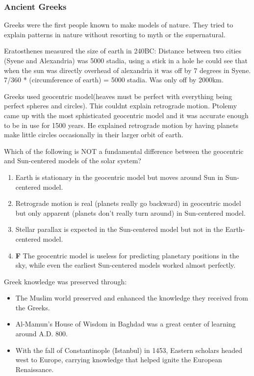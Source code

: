 \documentclass[12pt]{article}
\begin{document}
\subsubsection{Ancient Greeks}
Greeks were the first people known to make models of nature. They tried to explain patterns in nature without resorting to myth or the supernatural.

Eratosthenes measured the size of earth in 240BC: Distance between two cities (Syene and Alexandria) was 5000 stadia, using a stick in a hole he could see that when the sun was directly overhead of alexandria it was off by 7 degrees in Syene. 7/360 * (circumference of earth) = 5000 stadia. Was only off by 2000km.

Greeks used geocentric model(heaves must be perfect with everything being perfect spheres and circles). This couldnt explain retrograde motion. Ptolemy came up with the most sphisticated geocentric model and it was accurate enough to be in use for 1500 years. He explained retrograde motion by having planets make little circles occasionally in their larger orbit of earth.

Which of the following is NOT a fundamental difference between the geocentric and Sun-centered models of the  solar system?
\begin{enumerate}
\item Earth is stationary in the geocentric model but moves around Sun in Sun-centered model.
\item Retrograde motion is real (planets really go backward) in geocentric model but only apparent (planets don't really turn around) in Sun-centered model.
\item Stellar parallax is expected in the Sun-centered model but not in the Earth-centered model.
\item \textbf{F} The geocentric model is useless for predicting planetary positions in the sky, while even the earliest Sun-centered models worked almost perfectly.
\end{enumerate}

Greek knowledge was preserved through:
\begin{itemize}
\item The Muslim world preserved and enhanced the knowledge they received from the Greeks.
\item Al-Mamun's House of Wisdom in Baghdad was a great center of learning around A.D. 800.
\item With the fall of Constantinople (Istanbul) in 1453, Eastern scholars headed west to Europe, carrying knowledge that helped ignite the European Renaissance.
\end{itemize}
\end{document}
